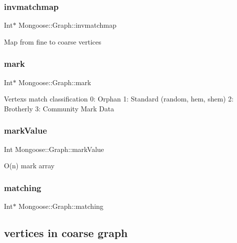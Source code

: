 \subsubsection{\texorpdfstring{invmatchmap}{invmatchmap}}
{\footnotesize\ttfamily Int$\ast$ Mongoose\+::\+Graph\+::invmatchmap}

Map from fine to coarse vertices \hypertarget{class_mongoose_1_1_graph_a09b695589f11535afebda107c703cb4e}{}\label{class_mongoose_1_1_graph_a09b695589f11535afebda107c703cb4e} 
\subsubsection{\texorpdfstring{mark}{mark}}
{\footnotesize\ttfamily Int$\ast$ Mongoose\+::\+Graph\+::mark}

Vertex\textquotesingle{}s match classification 0\+: Orphan 1\+: Standard (random, hem, shem) 2\+: Brotherly 3\+: Community Mark Data \hypertarget{class_mongoose_1_1_graph_a29d1189b1c70bd6911ac1436407eb6a5}{}\label{class_mongoose_1_1_graph_a29d1189b1c70bd6911ac1436407eb6a5} 
\subsubsection{\texorpdfstring{mark\+Value}{markValue}}
{\footnotesize\ttfamily Int Mongoose\+::\+Graph\+::mark\+Value}

O(n) mark array \hypertarget{class_mongoose_1_1_graph_aad78361401a6429fa93ae34d511f58f8}{}\label{class_mongoose_1_1_graph_aad78361401a6429fa93ae34d511f58f8} 
\subsubsection{\texorpdfstring{matching}{matching}}
{\footnotesize\ttfamily Int$\ast$ Mongoose\+::\+Graph\+::matching}

\subsection*{vertices in coarse graph}\hypertarget{class_mongoose_1_1_graph_af5a8e35dd4efe2b4f26bfb1f8b8bb6e3}{}\label{class_mongoose_1_1_graph_af5a8e35dd4efe2b4f26bfb1f8b8bb6e3} 
